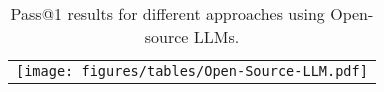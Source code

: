 \begin{table}[h]
    \centering
    \begin{tabular}{c}
    \hspace*{-0.35cm}
    \texttt{[image: figures/tables/Open-Source-LLM.pdf]}
    \end{tabular}
    \caption{Pass@1 results for different approaches using Open-source LLMs. }
    \label{tab:open-llm-results}
\end{table}
